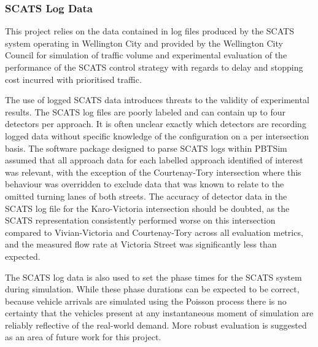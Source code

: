\subsubsection{SCATS Log Data}

 This project relies on the data contained in log files produced by the SCATS system operating in Wellington City and provided by the Wellington City Council for simulation of traffic volume and experimental evaluation of the performance of the SCATS control strategy with regards to delay and stopping cost incurred with prioritised traffic.
 
The use of logged SCATS data introduces threats to the validity of experimental results. The SCATS log files are poorly labeled and can contain up to four detectors per approach. It is often unclear exactly which detectors are recording logged data without specific knowledge of the configuration on a per intersection basis. The software package designed to parse SCATS logs within PBTSim assumed that all approach data for each labelled approach identified of interest was relevant, with the exception of the Courtenay-Tory intersection where this behaviour was overridden to exclude data that was known to relate to the omitted turning lanes of both streets. The accuracy of detector data in the SCATS log file for the Karo-Victoria intersection should be doubted, as the SCATS representation consistently performed worse on this intersection compared to Vivian-Victoria and Courtenay-Tory across all evaluation metrics, and the measured flow rate at Victoria Street was significantly less than expected.

The SCATS log data is also used to set the phase times for the SCATS system during simulation. While these phase durations can be expected to be correct, because vehicle arrivals are simulated using the Poisson process there is no certainty that the vehicles present at any instantaneous moment of simulation are reliably reflective of the real-world demand. More robust evaluation is suggested as an area of future work for this project.


